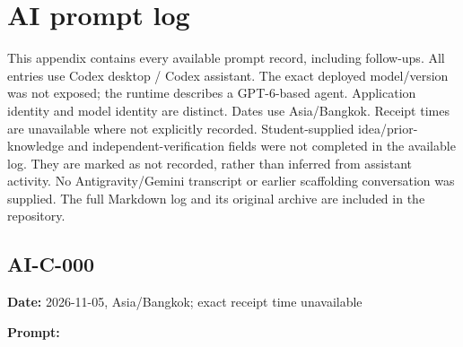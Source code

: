 \documentclass[11pt,a4paper]{article}
\begin{document}
\clearpage\appendix\section{AI prompt log}
This appendix contains every available prompt record, including follow-ups. All entries use Codex desktop / Codex assistant. The exact deployed model/version was not exposed; the runtime describes a GPT-6-based agent. Application identity and model identity are distinct. Dates use Asia/Bangkok. Receipt times are unavailable where not explicitly recorded.
Student-supplied idea/prior-knowledge and independent-verification fields were not completed in the available log. They are marked as not recorded, rather than inferred from assistant activity. No Antigravity/Gemini transcript or earlier scaffolding conversation was supplied. The full Markdown log and its original archive are included in the repository.
\subsection*{AI-C-000}
\noindent\textbf{Date:} 2026-11-05, Asia/\allowbreak{}Bangkok; exact receipt time unavailable\par
\noindent\textbf{Prompt:}
\end{document}

